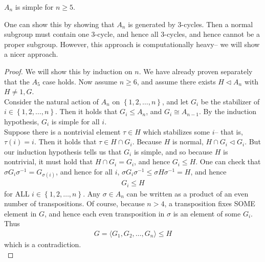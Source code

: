 \documentclass{memoir}
\begin{document}


\begin{thm}
	\(A_n\) is simple for \(n\geq 5\).
\end{thm}

One can show this by showing that \(A_n\) is generated by 3-cycles. Then a normal subgroup must contain one 3-cycle, and hence all 3-cycles, and hence cannot be a proper subgroup. However, this approach is computationally heavy-- we will show a nicer approach.

\begin{proof}
	We will show this by induction on \(n\). We have already proven separately that the \(A_5\) case holds. Now assume \(n\geq 6\), and assume there exists \(H \triangleleft A_n\) with \(H\neq 1,G\).\\

	Consider the natural action of \(A_n\) on \(\left\{ 1,2,\ldots,n \right\} \), and let \(G_i\) be the stabilizer of \(i \in \left\{ 1,2,\ldots,n \right\} \). Then it holds that \(G_i \leq A_n\), and \(G_i \cong A_{n-1}\). By the induction hypothesis, \(G_i\) is simple for all \(i\).\\

	Suppose there is a nontrivial element \(\tau  \in H\) which stabilizes some \(i\)-- that is, \(\tau (i) = i\). Then it holds that \(\tau  \in H\cap G_i\). Because \(H\) is normal, \(H\cap G_i \triangleleft G_i\). But our induction hypothesis tells us that \(G_i\) is simple, and so because \(H\) is nontrivial, it must hold that \(H\cap G_i = G_i\), and hence \(G_i \leq H\). One can check that \(\sigma G_i \sigma ^{-1} = G_{\sigma (i)}\), and hence for all \(i\), \(\sigma G_i \sigma ^{-1} \leq \sigma H \sigma ^{-1} = H\), and hence
	\begin{align*}
		G_i \leq  H
	\end{align*}
	for ALL \(i \in \left\{ 1,2,\ldots,n \right\} \). Any \(\sigma  \in A_n\) can be written as a product of an even number of transpositions. Of course, because \(n>4\), a transposition fixes SOME element in \(G\), and hence each even transposition in \(\sigma \) is an element of some \(G_i\). Thus
	\begin{align*}
		G = \langle G_1,G_2,\ldots,G_n \rangle \leq H
	\end{align*}
	which is a contradiction.\\


\end{proof}
\end{document}
